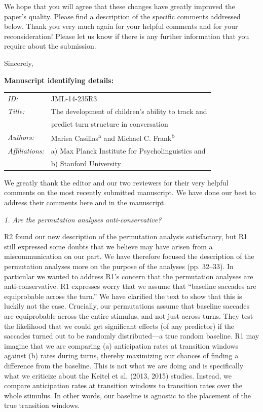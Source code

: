 \documentclass[11pt,a4paper]{letter} %
\begin{document}
\begin{letter}{}
\noindent We hope that you will agree that these changes have greatly improved the paper's quality. Please find a description of the specific comments addressed below. Thank you very much again for your helpful comments and for your reconsideration! Please let us know if there is any further information that you require about the submission.

\closing{Sincerely,}

\bigskip
\bigskip

\textbf{Manuscript identifying details:}

\begin{tabular}{ll}
\textit{ID:} & JML-14-235R3 \\
\textit{Title:} & The development of children's ability to track and \\
& predict turn structure in conversation \\
\textit{Authors:} & Marisa Casillas\textsuperscript{a} and Michael C. Frank\textsuperscript{b} \\
\textit{Affiliations:} & a) Max Planck Institute for Psycholinguistics and \\
& b) Stanford University
\end{tabular}

\newpage

\noindent We greatly thank the editor and our two reviewers for their very helpful comments on the most recently submitted manuscript. We have done our best to address their comments here and in the manuscript.

\medskip

\noindent \textit{1. Are the permutation analyses anti-conservative?}

\noindent R2 found our new description of the permutation analysis satisfactory, but R1 still expressed some doubts that we believe may have arisen from a miscommunication on our part. We have therefore focused the description of the permutation analyses more on the purpose of the analyses (pp. 32--33). In particular we wanted to address R1's concern that the permutation analyses are anti-conservative. R1 expresses worry that we assume that ``baseline saccades are equiprobable across the turn.'' We have clarified the text to show that this is luckily not the case. Crucially, our permutations assume that baseline saccades are equiprobable across the entire stimulus, and not just across turns. They test the likelihood that we could get significant effects (of any predictor) if the saccades turned out to be randomly distributed---a true random baseline.  R1 may imagine that we are comparing (a) anticipation rates at transition windows against (b) rates during turns, thereby maximizing our chances of finding a difference from the baseline. This is not what we are doing and is specifically what we criticize about the Keitel et al. (2013, 2015) studies. Instead, we compare anticipation rates at transition windows to transition rates over the whole stimulus. In other words, our baseline is agnostic to the placement of the true transition windows.


\end{letter}
\end{document}
